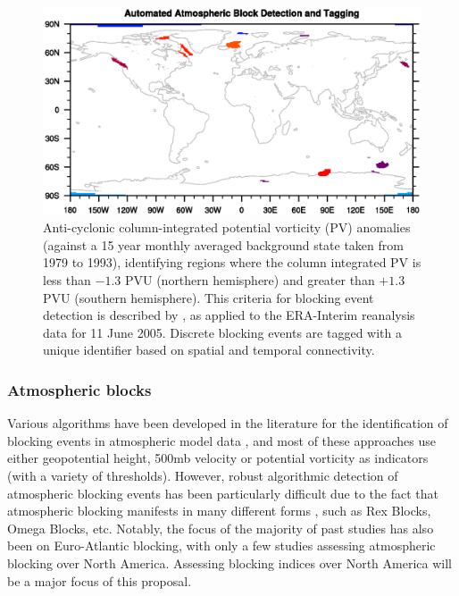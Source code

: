 \documentclass[11pt]{article}
\newcommand\citep{\cite}
\begin{document}
\begin{figure}[p]
\begin{center}
\includegraphics[trim=0.5cm 4.5cm 1cm 4.5cm, clip=true, width=5in]{blob_plot}
\end{center}
\caption{Anti-cyclonic column-integrated potential vorticity (PV) anomalies (against a 15 year monthly averaged background state taken from 1979 to 1993), identifying regions where the column integrated PV is less than $-1.3$ PVU (northern hemisphere) and greater than $+1.3$ PVU (southern hemisphere).  This criteria for blocking event detection is described by \cite{scherrer2006two}, as applied to the ERA-Interim reanalysis data for 11 June 2005.  Discrete blocking events are tagged with a unique identifier based on spatial and temporal connectivity.} \label{fig:BlockingDetection}
\end{figure}

\subsubsection{Atmospheric blocks}

Various algorithms have been developed in the literature for the identification of blocking events in atmospheric model data \citep{tibaldi1990operational, wiedenmann2002climatology, pelly2003new, schwierz2004perspicacious, scherrer2006two, tyrlis2008aspects, barriopedro2010application, barnes2012methodology}, and most of these approaches use either geopotential height, 500mb velocity or potential vorticity as indicators (with a variety of thresholds).  However, robust algorithmic detection of atmospheric blocking events has been particularly difficult due to the fact that atmospheric blocking manifests in many different forms \citep{haby2008blocking}, such as Rex Blocks, Omega Blocks, etc.  Notably, the focus of the majority of past studies has also been on Euro-Atlantic blocking, with only a few studies assessing atmospheric blocking over North America.  Assessing blocking indices over North America will be a major focus of this proposal.
\end{document}
